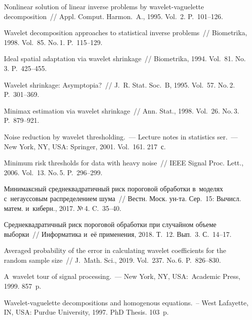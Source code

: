 \begin{multicols}{2}
\vspace*{-12pt}


{\small\frenchspacing
 {%
 \begin{thebibliography}{99}
  Nonlinear solution of linear inverse problems by 
wavelet-vaguelette decomposition~// Appl. Comput. Harmon.~A., 1995. Vol.~2. 
P.~101--126.

 Wavelet 
decomposition approaches to statistical inverse problems~// Biometrika, 1998. 
Vol.~85. No.\,1. P.~115--129.

 Ideal spatial adaptation via wavelet shrinkage~// 
Biometri\-ka, 1994. Vol.~81. No.\,3. P.~425--455.

Wavelet shrinkage: Asymptopia?~// J.~R. Stat. Soc.~B, 1995. Vol.~57. No.\,2. 
P.~301--369.

Minimax estimation via wavelet shrinkage~// 
Ann. Stat., 1998. Vol.~26. No.\,3. P.~879--921.

 Noise reduction by wavelet thresholding.~---  
Lecture notes in statistics ser.~--- New York, NY, USA: 
Springer, 2001. Vol.~161. 217~с.

 Minimum risk thresholds for data with heavy noise~// 
IEEE Signal Proc. Lett., 2006. Vol.~13. No.\,5. P.~296--299.

 Минимаксный среднеквадратичный риск пороговой обработки 
в~моделях с~негауссовым распределением шума~// Вестн. Моск. ун-та. Сер.~15: 
Вычисл. матем. и~киберн., 2017. №\,4. C.~35--40.

 Среднеквадратичный риск пороговой обработки при случайном объеме выборки~//
Информатика и~её применения, 2018. Т.~12. Вып.~3. С.~14--17.

 Averaged probability of the error in calculating
 wavelet coefficients for the random sample size~// J.~Math. Sci., 2019. Vol.~237. No.\,6. P.~826--830.

 A~wavelet tour of signal processing.~--- 
New York, NY, USA:~Academic Press, 1999. 857~p.

 Wavelet-vaguelette decompositions and homogenous equations.~-- 
West Lafayette, IN, USA: Purdue University, 1997.  PhD Thesis. 103~p.


\end{thebibliography}}}
\end{multicols}

